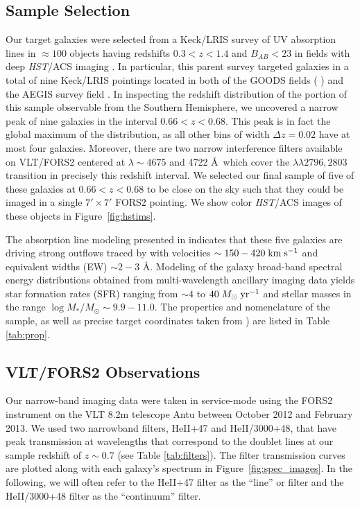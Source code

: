 \documentclass[twocolumn]{aastex61}
\def \mkms {{\rm \; km\;s^{-1}}}
\def \msunperyr {{\; M_{\odot}\rm \;yr^{-1}}}
\begin{document}
\subsection{Sample Selection}
Our target galaxies were selected from a Keck/LRIS survey of UV absorption lines in $\approx 100$ objects having redshifts $0.3< z < 1.4$ and $B_{AB}< 23$ in fields with deep \emph{HST}/ACS imaging \citep{Rubin_2014}.  In particular, this parent survey targeted galaxies in a total of nine Keck/LRIS pointings located in both of the GOODS fields (\citeauthor{Giavalisco2004} \citeyear{Giavalisco2004}) and the AEGIS survey field \citep[the Extended Groth Strip;][]{Davis2007}.  In inspecting the redshift distribution of the portion of this sample observable from the Southern Hemisphere, we uncovered a narrow peak of nine galaxies in the interval $0.66 < z < 0.68$.  This peak is in fact the global maximum of the distribution, as all other bins of width $\Delta z = 0.02$ have at most four galaxies.  Moreover, there are two narrow interference filters available on VLT/FORS2 centered at $\lambda \sim 4675$ and 4722 \AA\ which cover the  $\lambda \lambda 2796, 2803$ transition in precisely this redshift interval.  We selected our final sample of five of these galaxies at $0.66 < z < 0.68$ to be close on the sky such that they could be imaged in a single $7' \times 7' $ FORS2 pointing.  
We show color {\it HST}/ACS images of these objects in Figure~\ref{fig:hstims}.

The absorption line modeling presented in \cite{Rubin_2014} indicates that these five galaxies are driving strong outflows traced by   with velocities $\sim150-420\mkms$ and equivalent widths (EW) $\sim 2-3$ \AA.  Modeling of the galaxy broad-band spectral energy distributions obtained from multi-wavelength ancillary imaging data yields star formation rates (SFR) ranging from $\sim4$ to $40\msunperyr$ and stellar masses in the range $\log M_*/M_{\odot}\sim 9.9-11.0$. The properties and nomenclature of the sample, as well as precise target coordinates taken from \cite{Rubin_2014} ) are listed in Table \ref{tab:prop}. 


\subsection{VLT/FORS2 Observations}
Our narrow-band imaging data were taken in service-mode using the FORS2 instrument on the VLT 8.2m telescope Antu between October 2012 and February 2013. 
We used two narrowband filters, HeII+47 and HeII/3000+48, that have peak transmission at wavelengths that correspond to the  doublet lines at our sample redshift of $z\sim0.7$ (see Table \ref{tab:filters}). The filter transmission curves are plotted along with each galaxy's spectrum in Figure~\ref{fig:spec_images}.
In the following, we will often refer to the HeII+47 filter as the ``line'' or  filter and the HeII/3000+48 filter as the ``continuum'' filter.
\end{document}
